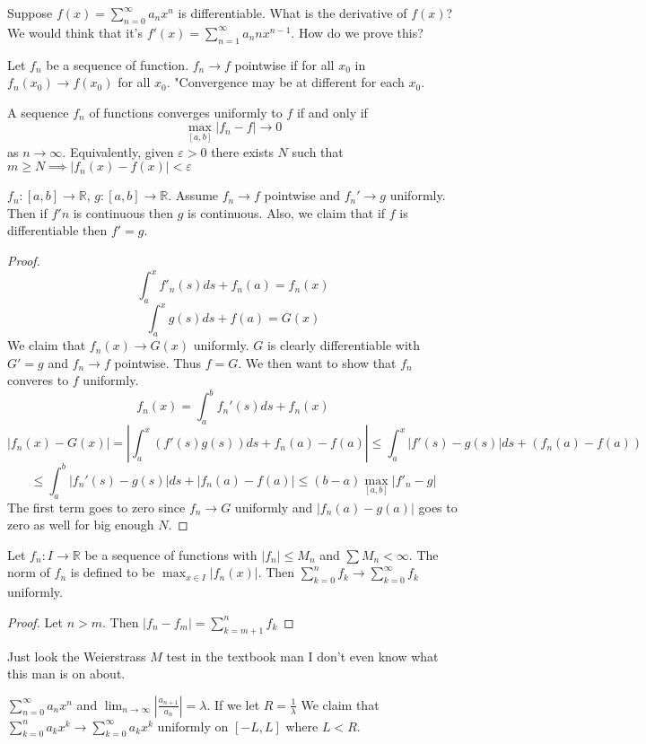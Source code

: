 \documentclass{article}
\newcommand{\R}{\mathbb{R}}
\newcommand{\eps}{\varepsilon}
\newcommand{\ra}[1][]{\xrightarrow{#1}}
\begin{document}
Suppose $f(x)=\sum_{n=0}^\infty a_nx^n$ is differentiable. What is the derivative of $f(x)$? We would think that it's $f'(x)=\sum_{n=1}^\infty a_nnx^{n-1}$. How do we prove this?
\begin{definition}
Let $f_n$ be a sequence of function. $f_n\ra f$ pointwise if for all $x_0$ in $f_n(x_0)\ra f(x_0)$ for all $x_0$. "Convergence may be at different for each $x_0$.
\end{definition}
\begin{definition}
A sequence $f_n$ of functions converges uniformly to $f$ if and only if $$\max_{[a,b]}|f_n-f|\ra 0$$ as $n\ra\infty$. Equivalently, given $\eps>0$ there exists $N$ such that $m\geq N\implies |f_n(x)-f(x)|<\eps$
\end{definition}
\begin{lemma}
$f_n:[a,b]\ra\R$, $g:[a,b]\ra\R$. Assume $f_n\ra f$ pointwise and $f_n'\ra g$ uniformly. Then if $f'n$ is continuous then $g$ is continuous. Also, we claim that if $f$ is differentiable then $f'=g$.
\end{lemma}
\begin{proof}
$$\int_a^xf'_n(s)ds+f_n(a)=f_n(x)$$
$$\int_a^xg(s)ds+f(a)=G(x)$$
We claim that $f_n(x)\ra G(x)$ uniformly. $G$ is clearly differentiable with $G'=g$ and $f_n\ra f$ pointwise. Thus $f=G$. We then want to show that $f_n$ converes to $f$ uniformly.
$$f_n(x)=\int_a^bf_n'(s)ds+f_n(x)$$
$$|f_n(x)-G(x)|=|\int_a^x(f'(s)g(s))ds+f_n(a)-f(a)|\leq \int_a^x |f'(s)-g(s)|ds+(f_n(a)-f(a))$$
$$\leq \int_a^b|f_n'(s)-g(s)|ds+|f_n(a)-f(a)|\leq (b-a)\max_{[a,b]}|f'_n-g|$$
The first term goes to zero since $f_n\ra G$ uniformly and $|f_n(a)-g(a)|$ goes to zero as well for big enough $N$.
\end{proof}
\begin{definition}
Let $f_n:I\ra\R$ be a sequence of functions with $|f_n|\leq M_n$ and $\sum M_n<\infty$. The norm of $f_n$ is defined to be $\max_{x\in I}|f_n(x)|$. Then $\sum_{k=0}^n f_k\ra \sum_{k=0}^\infty f_k$ uniformly.
\end{definition}
\begin{proof}
Let $n>m$. Then $|f_n-f_m|=\sum_{k=m+1}^n f_k$
\end{proof}
\begin{remark}
Just look the Weierstrass $M$ test in the textbook man I don't even know what this man is on about.
\end{remark}
\begin{lemma}
$\sum_{n=0}^\infty a_nx^n$ and $\lim_{n\to\infty}\left|\frac{a_{n+1}}{a_n}\right|=\lambda$. If we let $R=\frac{1}{\lambda}$ We claim that $\sum_{k=0}^na_kx^k\ra\sum_{k=0}^\infty a_kx^k$ uniformly on $[-L,L]$ where $L<R$.
\end{lemma}
\end{document}

